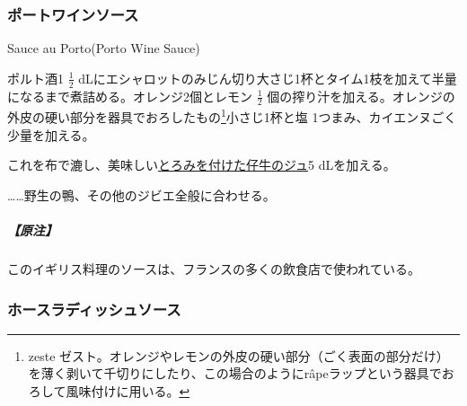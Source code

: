 \begin{recette}
\atoaki{}

\hypertarget{porto-wine-sauce}{%
\subsubsection{ポートワインソース}\label{porto-wine-sauce}}

\begin{frsubenv}

Sauce au Porto\hspace{1em}\normalfont(Porto Wine Sauce)

\end{frsubenv}


ポルト酒1 \(\frac{1}{2}\)
dLにエシャロットのみじん切り大さじ1杯とタイム1枝を加えて半量になるまで煮詰める。オレンジ2個とレモン
\(\frac{1}{2}\)
個の搾り汁を加える。オレンジの外皮の硬い部分を器具でおろしたもの\footnote{zeste
  ゼスト。オレンジやレモンの外皮の硬い部分（ごく表面の部分だけ）を薄く剥いて千切りにしたり、この場合のようにrâpeラップという器具でおろして風味付けに用いる。}小さじ1杯と塩
1つまみ、カイエンヌごく少量を加える。

これを布で漉し、美味しい\protect\hyperlink{jus-de-veau-lie}{とろみを付けた仔牛のジュ}5
dLを加える。

\ldots{}\ldots{}野生の鴨、その他のジビエ全般に合わせる。

\hypertarget{nota-porto-wine-sauce}{%
\subparagraph{【原注】}\label{nota-porto-wine-sauce}}

このイギリス料理のソースは、フランスの多くの飲食店で使われている。

\atoaki{}

\hypertarget{horse-radish-sauce}{%
\subsubsection{ホースラディッシュソース}\label{horse-radish-sauce}}

\begin{frsubenv}


\end{frsubenv}
\end{recette}
